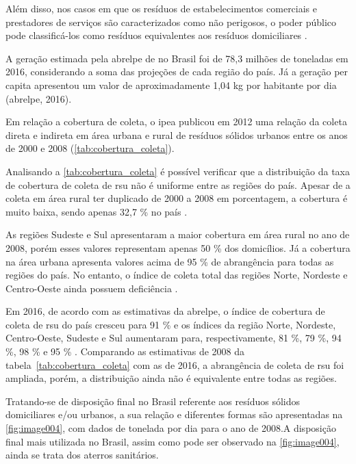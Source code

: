 Além disso, nos casos em que os resíduos de estabelecimentos comerciais e prestadores de serviços são caracterizados como não perigosos, o poder público pode classificá-los como resíduos equivalentes aos resíduos domiciliares \cite{brasil:12305}.

A geração estimada pela \gls{abrelpe} de  no Brasil foi de 78,3 milhões de toneladas em 2016, considerando a soma das projeções de cada região do país. Já a geração per capita apresentou um valor de aproximadamente 1,04 kg por habitante por dia (\gls{abrelpe}, 2016).

Em relação a cobertura de coleta, o \gls{ipea} publicou em 2012 uma relação da coleta direta e indireta em área urbana e rural de resíduos sólidos urbanos entre os anos de 2000 e 2008 (\autoref{tab:cobertura_coleta}).



Analisando a \autoref{tab:cobertura_coleta} é possível verificar que a distribuição da taxa de cobertura de coleta de \gls{rsu} não é uniforme entre as regiões do país. Apesar de a coleta em área rural ter duplicado de 2000 a 2008 em porcentagem, a cobertura é muito baixa, sendo apenas 32,7 \% no país \cite{IPEARSU2012}.

As regiões Sudeste e Sul apresentaram a maior cobertura em área rural no ano de 2008, porém esses valores representam apenas 50 \% dos domicílios. Já a cobertura na área urbana apresenta valores acima de 95 \% de abrangência para todas as regiões do país. No entanto, o índice de coleta total das regiões Norte, Nordeste e Centro-Oeste ainda possuem deficiência \cite{IPEARSU2012}.

Em 2016, de acordo com as estimativas da \gls{abrelpe}, o índice de cobertura de coleta de \gls{rsu} do país cresceu para 91 \% e os índices da região Norte, Nordeste, Centro-Oeste, Sudeste e Sul aumentaram para, respectivamente, 81 \%, 79 \%, 94 \%, 98 \% e 95 \% \cite{abrelpe:2016}. Comparando as estimativas de 2008 da tabela~\ref{tab:cobertura_coleta} com as de 2016, a abrangência de coleta de \gls{rsu} foi ampliada, porém, a distribuição ainda não é equivalente entre todas as regiões.

Tratando-se de disposição final no Brasil referente aos resíduos sólidos domiciliares e/ou urbanos, a sua relação e diferentes formas são apresentadas na \autoref{fig:image004}, com dados de tonelada por dia para o ano de 2008.A disposição final mais utilizada no Brasil, assim como pode ser observado na \autoref{fig:image004}, ainda se trata dos aterros sanitários. 

